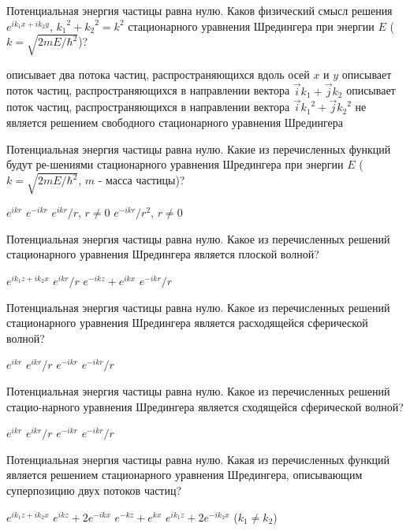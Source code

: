 \documentclass[11pt,a4paper]{exam}
\begin{document}
\begin{questions}
\question Потенциальная энергия частицы равна нулю. Каков физический смысл решения ${e^{i{k_1}x + i{k_2}y}}$, ${k_1}^2 + {k_2}^2 = {k^2}$ стационарного уравнения Шредингера при энергии $E$ ($k = \sqrt {2mE/{\hbar ^2}} $)?
\begin{choices}
\choice описывает два потока частиц, распространяющихся вдоль осей $x$ и $y$
\choice описывает поток частиц, распространяющихся в направлении вектора $\vec i{k_1} + \vec j{k_2}$
\choice описывает поток частиц, распространяющихся в направлении вектора $\vec i{k_1}^2 + \vec j{k_2}^2$   
\choice не является решением свободного стационарного уравнения Шредингера
\end{choices}

\question Потенциальная энергия частицы равна нулю. Какие из перечисленных функций будут ре-шениями стационарного уравнения Шредингера при энергии $E$ ($k = \sqrt {2mE/{\hbar ^2}} $, $m$ - масса частицы)?
\begin{choices}
\choice ${e^{ikr}}$    
\choice ${e^{ - ikr}}$    
\choice ${e^{ikr}}/r$, $r \ne 0$   
\choice ${e^{ - ikr}}/{r^2}$, $r \ne 0$
\end{choices}

\question Потенциальная энергия частицы равна нулю. Какое из перечисленных решений стационарного уравнения Шредингера является плоской волной?
\begin{choices}
\choice ${e^{i{k_1}z + i{k_2}x}}$  
\choice ${e^{ikr}}/r$  
\choice ${e^{ - ikz}} + {e^{ikx}}$    
\choice ${e^{ - ikr}}/r$ 
\end{choices}

\question Потенциальная энергия частицы равна нулю. Какое из перечисленных решений стационарного уравнения Шредингера является расходящейся сферической волной?
\begin{choices}
\choice ${e^{ikr}}$    
\choice ${e^{ikr}}/r$  
\choice ${e^{ - ikr}}$ 
\choice ${e^{ - ikr}}/r$ 
\end{choices}

\question Потенциальная энергия частицы равна нулю. Какое из перечисленных решений стацио-нарного уравнения Шредингера является сходящейся сферической волной?
\begin{choices}
\choice ${e^{ikr}}$    
\choice ${e^{ikr}}/r$  
\choice ${e^{ - ikr}}$ 
\choice ${e^{ - ikr}}/r$ 
\end{choices}

\question Потенциальная энергия частицы равна нулю. Какая из перечисленных функций является решением стационарного уравнения Шредингера, описывающим суперпозицию двух потоков частиц?
\begin{choices}
\choice ${e^{i{k_1}z + i{k_2}x}}$  
\choice ${e^{ikz}} + 2{e^{ - ikx}}$   
\choice ${e^{ - kz}} + {e^{kx}}$   
\choice ${e^{i{k_1}z}} + 2{e^{ - i{k_2}x}}$ (${k_1} \ne {k_2}$)
\end{choices}


\end{questions}
\end{document}
